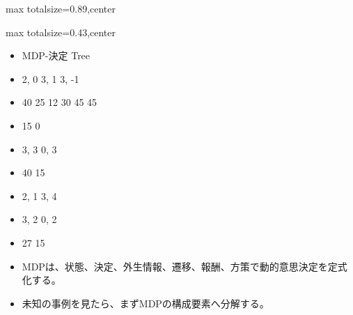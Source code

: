 \begin{minipage}[t]{0.58\textwidth}
\begin{adjustbox}{max totalsize={\textwidth}{0.89\textheight},center}
\begin{minipage}{\textwidth}
\end{minipage}
\end{adjustbox}
\end{minipage}


\clearpage
{}
\begin{minipage}[t]{0.405\textwidth}
\begin{adjustbox}{max totalsize={\textwidth}{0.43\textheight},center}
\begin{minipage}{\textwidth}\scriptsize
{}\begin{itemize}
\item MDP-決定 Tree
\item 2, 0 3, 1 3, -1
\item 40 25 12 30 45 45
\item 15 0
\item 3, 3 0, 3
\item 40 15
\item 2, 1 3, 4
\item 3, 2 0, 2
\item 27 15
\end{itemize}\begin{itemize}
\item MDPは、状態、決定、外生情報、遷移、報酬、方策で動的意思決定を定式化する。
\item 未知の事例を見たら、まずMDPの構成要素へ分解する。
\end{itemize}
\end{minipage}
\end{adjustbox}
\end{minipage}\hfill
